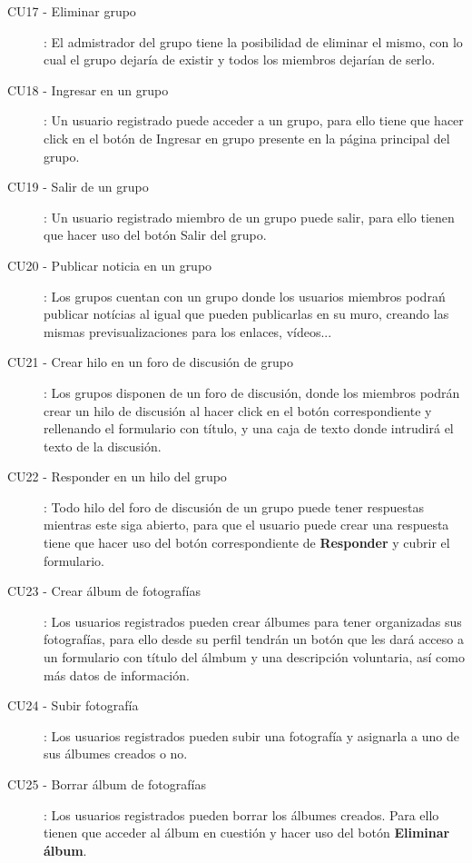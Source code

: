 \documentclass[12pt, a4paper, titlepage]{article}
\begin{document}
\begin{description}
	\item [CU17 - Eliminar grupo]: El admistrador del grupo tiene la posibilidad de eliminar el mismo, con lo cual el grupo dejaría de existir y todos los miembros dejarían de serlo.
	
	\item [CU18 - Ingresar en un grupo]: Un usuario registrado puede acceder a un grupo, para ello tiene que hacer click en el botón de Ingresar en grupo presente en la página principal del grupo.
	
	\item [CU19 - Salir de un grupo]: Un usuario registrado miembro de un grupo puede salir, para ello tienen que hacer uso del botón Salir del grupo.
	
	\item [CU20 - Publicar noticia en un grupo]: Los grupos cuentan con un grupo donde los usuarios miembros podrań publicar notícias al igual que pueden publicarlas en su muro, creando las mismas previsualizaciones para los enlaces, vídeos...
	
	\item [CU21 - Crear hilo en un foro de discusión de grupo]: Los grupos disponen de un foro de discusión, donde los miembros podrán crear un hilo de discusión al hacer click en el botón correspondiente y rellenando el formulario con título, y una caja de texto donde intrudirá el texto de la discusión.
	
	\item [CU22 - Responder en un hilo del grupo]: Todo hilo del foro de discusión de un grupo puede tener respuestas mientras este siga abierto, para que el usuario puede crear una respuesta tiene que hacer uso del botón correspondiente de \textbf{Responder} y cubrir el formulario.
	
	\item [CU23 - Crear álbum de fotografías]: Los usuarios registrados pueden crear álbumes para tener organizadas sus fotografías, para ello desde su perfil tendrán un botón que les dará acceso a un formulario con título del álmbum y una descripción voluntaria, así como más datos de información.
	
	\item [CU24 - Subir fotografía]:  Los usuarios registrados pueden subir una fotografía y asignarla a uno de sus álbumes creados o no. 
	
	\item [CU25 - Borrar álbum de fotografías]: Los usuarios registrados pueden borrar los álbumes creados. Para ello tienen que acceder al álbum en cuestión y hacer uso del botón \textbf{Eliminar álbum}.
	

\end{description}
\end{document}
